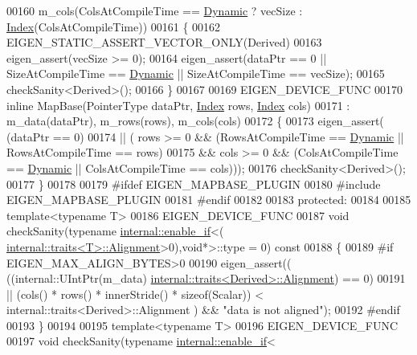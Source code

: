 \begin{DoxyCode}
00160               m\_cols(ColsAtCompileTime == \hyperlink{namespace_eigen_ad81fa7195215a0ce30017dfac309f0b2}{Dynamic} ? vecSize : \hyperlink{namespace_eigen_a62e77e0933482dafde8fe197d9a2cfde}{Index}(ColsAtCompileTime))
00161     \{
00162       EIGEN\_STATIC\_ASSERT\_VECTOR\_ONLY(Derived)
00163       eigen\_assert(vecSize >= 0);
00164       eigen\_assert(dataPtr == 0 || SizeAtCompileTime == \hyperlink{namespace_eigen_ad81fa7195215a0ce30017dfac309f0b2}{Dynamic} || SizeAtCompileTime == vecSize);
00165       checkSanity<Derived>();
00166     \}
00167 
00169     EIGEN\_DEVICE\_FUNC
00170     \textcolor{keyword}{inline} MapBase(PointerType dataPtr, \hyperlink{namespace_eigen_a62e77e0933482dafde8fe197d9a2cfde}{Index} rows, \hyperlink{namespace_eigen_a62e77e0933482dafde8fe197d9a2cfde}{Index} cols)
00171             : m\_data(dataPtr), m\_rows(rows), m\_cols(cols)
00172     \{
00173       eigen\_assert( (dataPtr == 0)
00174               || (   rows >= 0 && (RowsAtCompileTime == \hyperlink{namespace_eigen_ad81fa7195215a0ce30017dfac309f0b2}{Dynamic} || RowsAtCompileTime == rows)
00175                   && cols >= 0 && (ColsAtCompileTime == \hyperlink{namespace_eigen_ad81fa7195215a0ce30017dfac309f0b2}{Dynamic} || ColsAtCompileTime == cols)));
00176       checkSanity<Derived>();
00177     \}
00178 
00179 \textcolor{preprocessor}{    #ifdef EIGEN\_MAPBASE\_PLUGIN}
00180 \textcolor{preprocessor}{    #include EIGEN\_MAPBASE\_PLUGIN}
00181 \textcolor{preprocessor}{    #endif}
00182 
00183   \textcolor{keyword}{protected}:
00184 
00185     \textcolor{keyword}{template}<\textcolor{keyword}{typename} T>
00186     EIGEN\_DEVICE\_FUNC
00187     \textcolor{keywordtype}{void} checkSanity(\textcolor{keyword}{typename} \hyperlink{struct_eigen_1_1internal_1_1enable__if}{internal::enable\_if}<(
      \hyperlink{struct_eigen_1_1internal_1_1traits}{internal::traits<T>::Alignment}>0),\textcolor{keywordtype}{void}*>::type = 0)\textcolor{keyword}{ const}
00188 \textcolor{keyword}{    }\{
00189 \textcolor{preprocessor}{#if EIGEN\_MAX\_ALIGN\_BYTES>0}
00190       eigen\_assert((   ((internal::UIntPtr(m\_data) %
      \hyperlink{struct_eigen_1_1internal_1_1traits}{internal::traits<Derived>::Alignment}) == 0)
00191                     || (cols() * rows() * innerStride() * \textcolor{keyword}{sizeof}(Scalar)) < 
      internal::traits<Derived>::Alignment ) && \textcolor{stringliteral}{"data is not aligned"});
00192 \textcolor{preprocessor}{#endif}
00193     \}
00194 
00195     \textcolor{keyword}{template}<\textcolor{keyword}{typename} T>
00196     EIGEN\_DEVICE\_FUNC
00197     \textcolor{keywordtype}{void} checkSanity(\textcolor{keyword}{typename} \hyperlink{struct_eigen_1_1internal_1_1enable__if}{internal::enable\_if}<

\end{DoxyCode}
